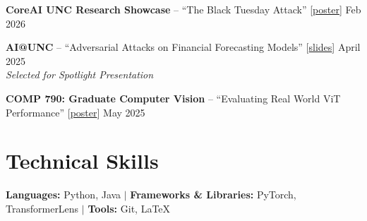 \documentclass[11pt,letterpaper]{article}
\newcommand{\dates}[1]{\hfill #1}
\begin{document}
\textbf{CoreAI UNC Research Showcase} -- ``The Black Tuesday Attack''
[\href{https://drive.google.com/file/d/1dxe09yK2t-jKYxDvMgamqlDRq_Eh0SYO/view?usp=sharing}{poster}]
\dates{Feb 2026}

\textbf{AI@UNC} -- ``Adversarial Attacks on Financial Forecasting Models''
[\href{https://drive.google.com/file/d/1wtKcK2hbIyacfg8mf0JP0TJNtrU2I4Q9/view?usp=sharing}{slides}]
\dates{April 2025} \\
\hspace*{1em}\textit{Selected for Spotlight Presentation}

\textbf{COMP 790: Graduate Computer Vision} -- ``Evaluating Real World ViT Performance''
[\href{https://drive.google.com/file/d/1pDFAlfCgygF0m94B9xhhYrKzUEZAEjkT/view?usp=sharing}{poster}]
\dates{May 2025}

\section{Technical Skills}

\textbf{Languages:} Python, Java $\mid$
\textbf{Frameworks \& Libraries:} PyTorch, TransformerLens $\mid$
\textbf{Tools:} Git, \LaTeX
\end{document}
